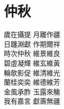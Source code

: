 \chapter[仲秋]{仲\qquad 秋}

\begin{center}
歲在攝提 \fspace 月離作疆 \\
日躔淵獻 \fspace 作期爾祥 \\
時次仲秋 \fspace 維景維良 \\
碧虛凝輝 \fspace 維玄維黃 \\
輪欹影促 \fspace 維清維光 \\
蘭桂奕奕 \fspace 維德維芳 \\
金風承酢 \fspace 玉露來觴 \\
我有嘉言 \fspace 獻壽無疆
\end{center}
